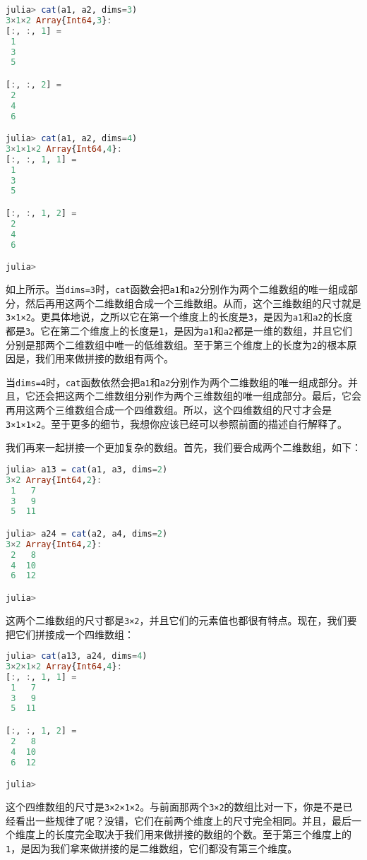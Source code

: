 \begin{lstlisting}[language=julia]
julia> cat(a1, a2, dims=3)
3×1×2 Array{Int64,3}:
[:, :, 1] =
 1
 3
 5

[:, :, 2] =
 2
 4
 6

julia> cat(a1, a2, dims=4)
3×1×1×2 Array{Int64,4}:
[:, :, 1, 1] =
 1
 3
 5

[:, :, 1, 2] =
 2
 4
 6

julia> 
\end{lstlisting}

如上所示。当\verb`dims=3`时，\verb`cat`函数会把\verb`a1`和\verb`a2`分别作为两个二维数组的唯一组成部分，然后再用这两个二维数组合成一个三维数组。从而，这个三维数组的尺寸就是\verb`3×1×2`。更具体地说，之所以它在第一个维度上的长度是\verb`3`，是因为\verb`a1`和\verb`a2`的长度都是\verb`3`。它在第二个维度上的长度是\verb`1`，是因为\verb`a1`和\verb`a2`都是一维的数组，并且它们分别是那两个二维数组中唯一的低维数组。至于第三个维度上的长度为\verb`2`的根本原因是，我们用来做拼接的数组有两个。

当\verb`dims=4`时，\verb`cat`函数依然会把\verb`a1`和\verb`a2`分别作为两个二维数组的唯一组成部分。并且，它还会把这两个二维数组分别作为两个三维数组的唯一组成部分。最后，它会再用这两个三维数组合成一个四维数组。所以，这个四维数组的尺寸才会是\verb`3×1×1×2`。至于更多的细节，我想你应该已经可以参照前面的描述自行解释了。

我们再来一起拼接一个更加复杂的数组。首先，我们要合成两个二维数组，如下：

\begin{lstlisting}[language=julia]
julia> a13 = cat(a1, a3, dims=2)
3×2 Array{Int64,2}:
 1   7
 3   9
 5  11

julia> a24 = cat(a2, a4, dims=2)
3×2 Array{Int64,2}:
 2   8
 4  10
 6  12

julia> 
\end{lstlisting}

这两个二维数组的尺寸都是\verb`3×2`，并且它们的元素值也都很有特点。现在，我们要把它们拼接成一个四维数组：

\begin{lstlisting}[language=julia]
julia> cat(a13, a24, dims=4)
3×2×1×2 Array{Int64,4}:
[:, :, 1, 1] =
 1   7
 3   9
 5  11

[:, :, 1, 2] =
 2   8
 4  10
 6  12

julia> 
\end{lstlisting}

这个四维数组的尺寸是\verb`3×2×1×2`。与前面那两个\verb`3×2`的数组比对一下，你是不是已经看出一些规律了呢？没错，它们在前两个维度上的尺寸完全相同。并且，最后一个维度上的长度完全取决于我们用来做拼接的数组的个数。至于第三个维度上的\verb`1`，是因为我们拿来做拼接的是二维数组，它们都没有第三个维度。

